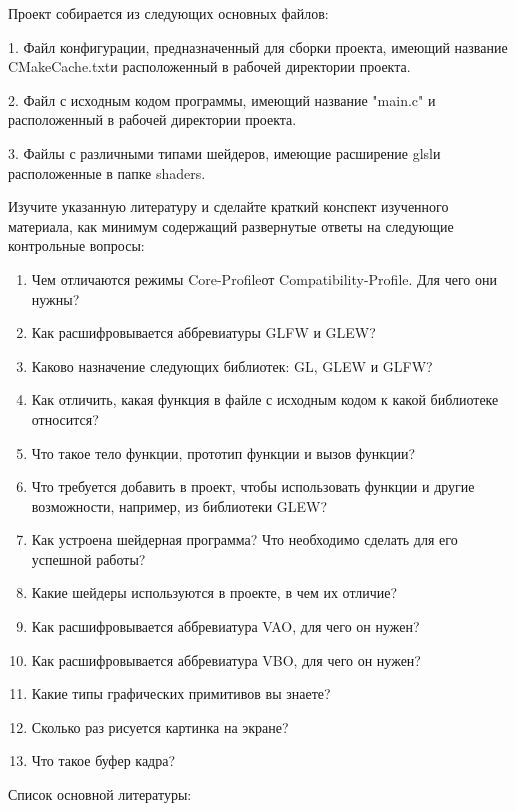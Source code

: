 \documentclass[a4paper,12pt]{article}
\begin{document}
    Проект собирается из следующих основных файлов:
    
    1. Файл конфигурации, предназначенный для сборки проекта, имеющий название \textquotedbl CMakeCache.txt\textquotedbl и расположенный в рабочей директории проекта.
    
    2. Файл с исходным кодом программы, имеющий название "main.c" и расположенный в рабочей директории проекта.
    
    3. Файлы с различными типами шейдеров, имеющие расширение \textquotedbl glsl\textquotedbl и расположенные в папке \textquotedbl shaders\textquotedbl.
    
    
    
    Изучите указанную литературу и сделайте краткий конспект изученного материала, как минимум содержащий развернутые ответы на следующие контрольные вопросы:
    \begin{enumerate}
    \item Чем отличаются режимы \textquotedbl Core-Profile\textquotedbl от \textquotedbl Compatibility-Profile\textquotedbl. Для чего они нужны?
    \item Как расшифровывается аббревиатуры GLFW и GLEW?
    \item Каково назначение следующих библиотек: GL, GLEW и GLFW? 
    \item Как отличить, какая функция в файле с исходным кодом к какой библиотеке относится?
    \item Что такое тело функции, прототип функции и вызов функции?
    \item Что требуется добавить в проект, чтобы использовать функции и другие возможности, например, из библиотеки GLEW?
    \item Как устроена шейдерная программа? Что необходимо сделать для его успешной работы?
    \item Какие шейдеры используются в проекте, в чем их отличие?
    \item Как расшифровывается аббревиатура VAO, для чего он нужен?
    \item Как расшифровывается аббревиатура VBO, для чего он нужен?
    \item Какие типы графических примитивов вы знаете?
    \item Сколько раз рисуется картинка на экране?
    \item Что такое буфер кадра?
    \end{enumerate}
    
    
    
    Список основной литературы:
    
\end{document}
